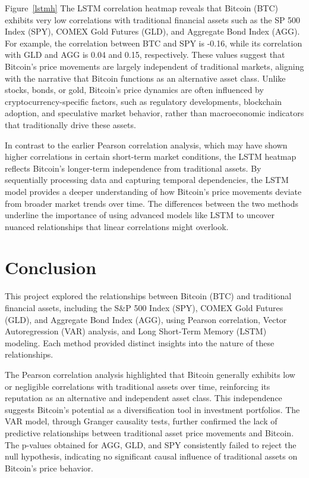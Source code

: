 \documentclass{article}
\begin{document}
Figure~\ref{lstmh} The LSTM correlation heatmap reveals that Bitcoin (BTC) exhibits very low correlations with traditional financial assets such as the SP 500 Index (SPY), COMEX Gold Futures (GLD), and Aggregate Bond Index (AGG). For example, the correlation between BTC and SPY is -0.16, while its correlation with GLD and AGG is 0.04 and 0.15, respectively. These values suggest that Bitcoin's price movements are largely independent of traditional markets, aligning with the narrative that Bitcoin functions as an alternative asset class. Unlike stocks, bonds, or gold, Bitcoin’s price dynamics are often influenced by cryptocurrency-specific factors, such as regulatory developments, blockchain adoption, and speculative market behavior, rather than macroeconomic indicators that traditionally drive these assets.

In contrast to the earlier Pearson correlation analysis, which may have shown higher correlations in certain short-term market conditions, the LSTM heatmap reflects Bitcoin’s longer-term independence from traditional assets. By sequentially processing data and capturing temporal dependencies, the LSTM model provides a deeper understanding of how Bitcoin’s price movements deviate from broader market trends over time. The differences between the two methods underline the importance of using advanced models like LSTM to uncover nuanced relationships that linear correlations might overlook.

\section{Conclusion}

This project explored the relationships between Bitcoin (BTC) and traditional financial assets, including the S\&P 500 Index (SPY), COMEX Gold Futures (GLD), and Aggregate Bond Index (AGG), using Pearson correlation, Vector Autoregression (VAR) analysis, and Long Short-Term Memory (LSTM) modeling. Each method provided distinct insights into the nature of these relationships.

The Pearson correlation analysis highlighted that Bitcoin generally exhibits low or negligible correlations with traditional assets over time, reinforcing its reputation as an alternative and independent asset class. This independence suggests Bitcoin's potential as a diversification tool in investment portfolios. The VAR model, through Granger causality tests, further confirmed the lack of predictive relationships between traditional asset price movements and Bitcoin. The p-values obtained for AGG, GLD, and SPY consistently failed to reject the null hypothesis, indicating no significant causal influence of traditional assets on Bitcoin's price behavior.
\end{document}
